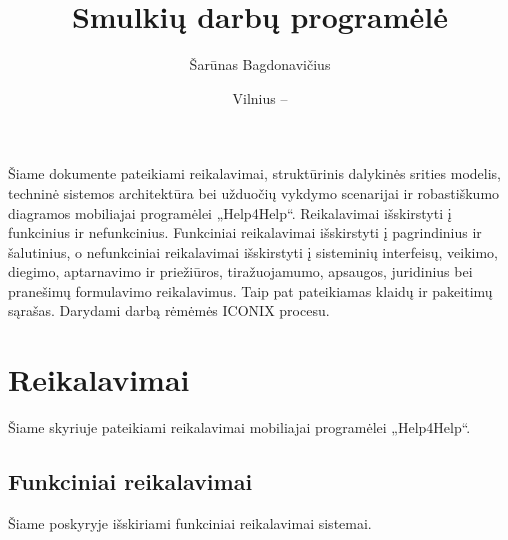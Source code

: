 \documentclass{VUMIFPSbakalaurinis}
\title{Smulkių darbų programėlė}
\author{Šarūnas Bagdonavičius}
\date{Vilnius – \the\year}
\begin{document}
\maketitle
\tableofcontents

Šiame dokumente pateikiami reikalavimai, struktūrinis dalykinės srities modelis, techninė sistemos architektūra bei užduočių vykdymo scenarijai ir robastiškumo diagramos mobiliajai programėlei „Help4Help“. Reikalavimai išskirstyti į funkcinius ir nefunkcinius. Funkciniai reikalavimai išskirstyti į pagrindinius ir šalutinius, o nefunkciniai reikalavimai išskirstyti į sisteminių interfeisų, veikimo, diegimo, aptarnavimo ir priežiūros, tiražuojamumo, apsaugos, juridinius bei pranešimų formulavimo reikalavimus. Taip pat pateikiamas klaidų ir pakeitimų sąrašas. Darydami darbą rėmėmės ICONIX procesu.

\section{Reikalavimai}
Šiame skyriuje pateikiami reikalavimai mobiliajai programėlei „Help4Help“.
\subsection{Funkciniai reikalavimai}
Šiame poskyryje išskiriami funkciniai reikalavimai sistemai.
\end{document}
